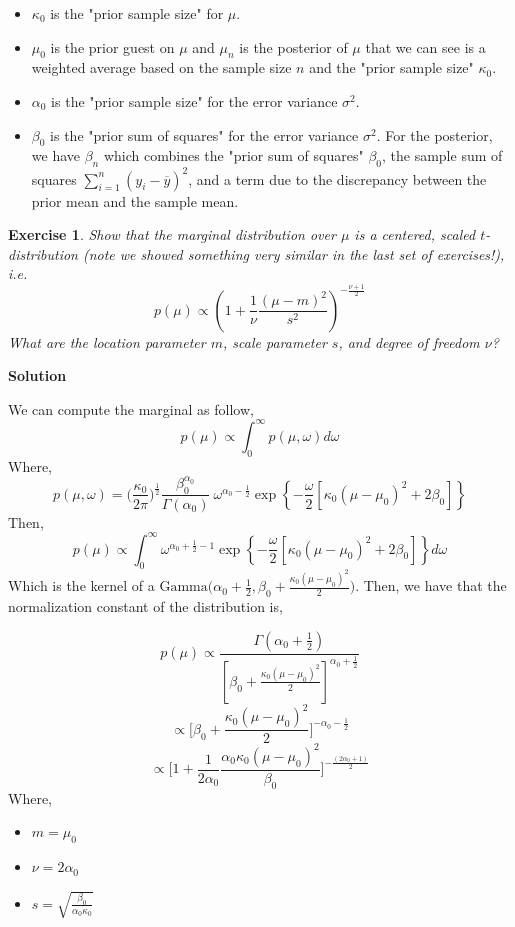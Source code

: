 \documentclass[twoside]{article}
\newcounter{lecnum}
\newtheorem{exercise}{Exercise}[lecnum]
\begin{document}
\begin{itemize}
	\item $\kappa_0$ is the "prior sample size" for $\mu$.
	\item $\mu_0$ is the prior guest on $\mu$ and $\mu_n$ is the posterior of $\mu$ that we can see is a weighted average based on the sample size $n$ and the "prior sample size" $\kappa_0$.
	\item $\alpha_0$ is the "prior sample size" for the error variance $\sigma^2$.
	\item $\beta_0$ is the "prior sum of squares" for the error variance $\sigma^2$. For the posterior, we have $\beta_n$ which combines the "prior sum of squares" $\beta_0$, the sample sum of squares $\sum_{i=1}^{n} (y_i - \overline{y})^2$, and a term due to the discrepancy between the prior mean and the sample mean.
\end{itemize}
\color{black}

\begin{exercise}
  Show that the marginal distribution over $\mu$ is a centered, scaled $t$-distribution (note we showed something very similar in the last set of exercises!), i.e.\
  $$p(\mu) \propto \left(1+\frac{1}{\nu}\frac{(\mu-m)^2}{s^2}\right)^{-\frac{\nu+1}{2}}$$
  What are the location parameter $m$, scale parameter $s$, and degree of freedom $\nu$?
\end{exercise}

\color{blue}
\textbf{Solution}

We can compute the marginal as follow,
$$ p(\mu) \propto \int_{0}^{\infty } p(\mu, \omega) d\omega 
$$
Where, 
$$p(\mu, \omega) 
= \bigg(\frac{\kappa_0}{ 2 \pi} \bigg)^{\frac{1}{2}} \frac{\beta_0^{\alpha_0}}{\Gamma (\alpha_0) }\
\omega^{\alpha_0-\frac{1}{2}} 
\exp\left\{ -\frac{\omega }{2} [\kappa_0(\mu - \mu_0)^2 + 2\beta_0] \right\} 
$$
Then, 
$$ p(\mu) \propto  \int_{0}^{\infty } 
\omega^{\alpha_0+\frac{1}{2}-1} 
\exp\left\{ -\frac{\omega }{2} [\kappa_0(\mu - \mu_0)^2 + 2\beta_0] \right\} 
d\omega
$$
Which is the kernel of a $\mbox{Gamma}\bigg(\alpha_0 + \frac{1}{2}, 
\beta_0 + \frac{\kappa_0(\mu - \mu_0)^2}{2} \bigg) $. Then, we have that the normalization constant of the distribution is,

$$ p(\mu) \propto 
\frac{\Gamma(\alpha_0 + \frac{1}{2}) }{[\beta_0 + \frac{\kappa_0(\mu - \mu_0)^2}{2}]^{\alpha_0 + \frac{1}{2}}}$$ 
$$  \propto 
\bigg[\beta_0 + \frac{\kappa_0(\mu - \mu_0)^2}{2}\bigg]^{-\alpha_0 - \frac{1}{2}}$$
$$  \propto 
\bigg[1 + \frac{1}{2\alpha_0}\frac{\alpha_0\kappa_0(\mu - \mu_0)^2}{\beta_0}\bigg]^{-\frac{(2\alpha_0 +1 )}{2}}$$
Where,
\begin{itemize}
	\item  $ m = \mu_0 $
	\item  $ \nu= 2 \alpha_0$
	\item $ s = \sqrt{\frac{\beta_0}{\alpha_0 \kappa_0}}$
\end{itemize}
\end{document}

